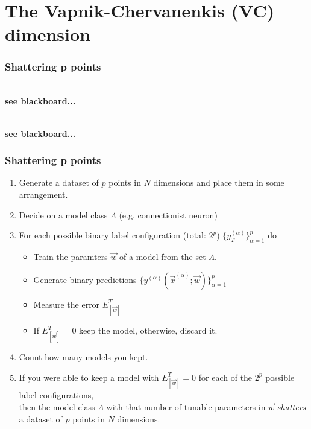 \section{The Vapnik-Chervanenkis (VC) dimension}\label{seq:dvc}


\begin{frame}\frametitle{Shattering p points}

\\

\textbf{see blackboard...}


\\


\textbf{see blackboard...}

\end{frame}

\begin{frame}\frametitle{Shattering p points}

\begin{enumerate}
\item Generate a dataset of $p$ points in $N$ dimensions and place them in some arrangement.
\pause
\item Decide on a model class $\Lambda$ (e.g. connectionist neuron)
\pause
\item For each possible binary label configuration (total: $2^p$) $\{y_T^{(\alpha)}\}_{\alpha=1}^p$ do
	\begin{itemize}
	\item[] Train the paramters $\vec w$ of a model from the set $\Lambda$.
	\item[] Generate binary predictions $\{y^{(\alpha)}(\vec x^{(\alpha)}; \vec w)\}_{\alpha=1}^p$
	\item[] Measure the error $E^T_{[\vec w]}$
	\item[] If $E^T_{[\vec w]} = 0$ keep the model, otherwise, discard it. 
	\end{itemize}
\item Count how many models you kept.\\
\pause
\item[] If you were able to keep a model with $E^T_{[\vec w]} = 0$ for each of the $2^p$ possible label configurations,\\
then the model class $\Lambda$ with that number of tunable parameters in $\vec w$ \emph{shatters} a dataset of $p$ points in $N$ dimensions.
\end{enumerate}

\end{frame}

